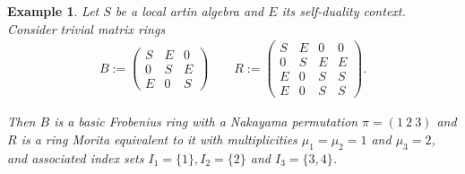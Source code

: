 \documentclass[11pt]{article}
\theoremstyle{plain}
\newtheorem{Ex}[veta]{Example}
\theoremstyle{remark}
\theoremstyle{plain}
\begin{document}
\begin{Ex}
    Let $S$ be a local artin algebra and $E$ its self-duality context. Consider trivial matrix rings 
\begin{gather*}
    B:=\begin{pmatrix}
    S&E&0\\
    0&S&E\\
E&0&S \end{pmatrix}\qquad R:=\begin{pmatrix}
    S&E&0&0\\
    0&S&E&E\\
E&0&S&S\\
E&0&S&S
\end{pmatrix}.
\end{gather*}  

Then $B$ is a basic Frobenius ring with a Nakayama permutation $\pi=(1~2~3)$ and $R$ is a ring Morita equivalent to it with multiplicities $\mu_1=\mu_2=1$ and $\mu_3=2$, and associated index sets $I_1=\{1\}, I_2=\{2\}$ and $I_3=\{3,4\}$. 


\end{Ex}
\end{document}
